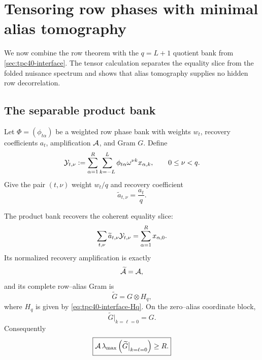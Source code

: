 \section{Tensoring row phases with minimal alias tomography}
\label{sec:tpc40-alias-tensor}

We now combine the row theorem with the \(q=L+1\) quotient bank from
\cref{sec:tpc40-interface}.  The tensor calculation separates the
equality slice from the folded nuisance spectrum and shows that alias
tomography supplies no hidden row decorrelation.

\subsection{The separable product bank}

Let \(\Phi=(\phi_{t\alpha})\) be a weighted row phase bank with weights
\(w_t\), recovery coefficients \(a_t\), amplification \(\mathcal A\), and Gram
\(G\).  Define
\begin{equation}
 \mathcal Y_{t,\nu}
 :=\sum_{\alpha=1}^{R}\sum_{k=-L}^{L}
 \phi_{t\alpha}\omega^{\nu k}x_{\alpha,k},
 \qquad
 0\le\nu<q.
 \label{eq:tpc40-product-measurements}
\end{equation}
Give the pair \((t,\nu)\) weight \(w_t/q\) and recovery coefficient
\begin{equation}
 \widetilde a_{t,\nu}=\frac{a_t}{q}.
 \label{eq:tpc40-product-recovery-coefficient}
\end{equation}

\begin{theorem}
\label{thm:tpc40-tensor-recovery}
The product bank recovers the coherent equality slice:
\begin{equation}
 \sum_{t,\nu}\widetilde a_{t,\nu}\mathcal Y_{t,\nu}
 =\sum_{\alpha=1}^{R}x_{\alpha,0}.
 \label{eq:tpc40-product-recovery}
\end{equation}
Its normalized recovery amplification is exactly
\begin{equation}
 \widetilde{\mathcal A}=\mathcal A,
 \label{eq:tpc40-product-amplification}
\end{equation}
and its complete row--alias Gram is
\begin{equation}
 \widetilde G=G\otimes H_q,
 \label{eq:tpc40-product-Gram}
\end{equation}
where \(H_q\) is given by
\eqref{eq:tpc40-interface-Hq}.  On the zero--alias coordinate block,
\begin{equation}
 \widetilde G\big|_{k=\ell=0}=G.
 \label{eq:tpc40-zero-alias-Gram}
\end{equation}
Consequently
\begin{equation}
 \boxed{
 \mathcal A\,\lambda_{\max}
 \left(\widetilde G\big|_{k=\ell=0}\right)\ge R.}
 \label{eq:tpc40-tensor-tradeoff}
\end{equation}
\end{theorem}

